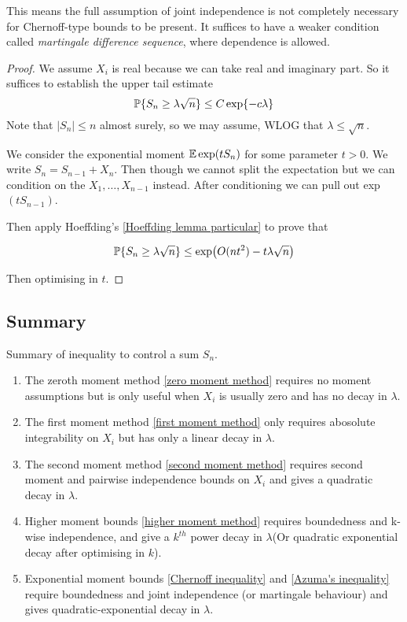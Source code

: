This means the full assumption of joint independence is not completely necessary for Chernoff-type bounds to be present. It suffices to have a weaker condition called \textit{martingale difference sequence}, where dependence is allowed.

\begin{proof}
    We assume $X_i$ is real because we can take real and imaginary part. So it suffices to establish the upper tail estimate 
    \begin{equation*}
        \mathbb{P}\{S_n\geq \lambda \sqrt{n} \}\leq C \exp\{-c\lambda\}
    \end{equation*}
    Note that $|S_n|\leq n $ almost surely, so we may assume, WLOG that $\lambda \leq  \sqrt{n}$.

    We consider the exponential moment $\mathbb{E} \exp (tS_n)$ for some parameter $t>0$. We write $S_n = S_{n-1}+X_n$. Then though we cannot split the expectation but we can condition on the $X_1,\dots,X_{n-1}$ instead. After conditioning we can pull out exp$(tS_{n-1})$.

    Then apply Hoeffding's \ref{Hoeffding lemma particular} to prove that

    \begin{equation*}
        \mathbb{P}\{S_n \geq \lambda \sqrt{n} \} \leq \exp(O(nt^2)-t \lambda\sqrt{n})
    \end{equation*}

    Then optimising in $t$.

\end{proof}

\subsection{Summary}

Summary of inequality to control a sum $S_n$.

\begin{enumerate}
    \item The zeroth moment method \ref{zero moment method} requires no moment assumptions but is only useful when $X_i$ is usually zero and has no decay in $\lambda$.
    \item The first moment method \ref{first moment method} only requires abosolute integrability on $X_i$ but has only a linear decay in $\lambda$.
    \item The second moment method \ref{second moment method} requires second moment and pairwise independence bounds on $X_i$ and gives a quadratic decay in $\lambda$.
    \item Higher moment bounds \ref{higher moment method} requires boundedness and k-wise independence, and give a $k^{th}$ power decay in $\lambda$(Or quadratic exponential decay after optimising in $k$).
    \item Exponential moment bounds \ref{Chernoff inequality} and \ref{Azuma's inequality} require boundedness and joint independence (or martingale behaviour) and gives quadratic-exponential decay in $\lambda$.
\end{enumerate}


